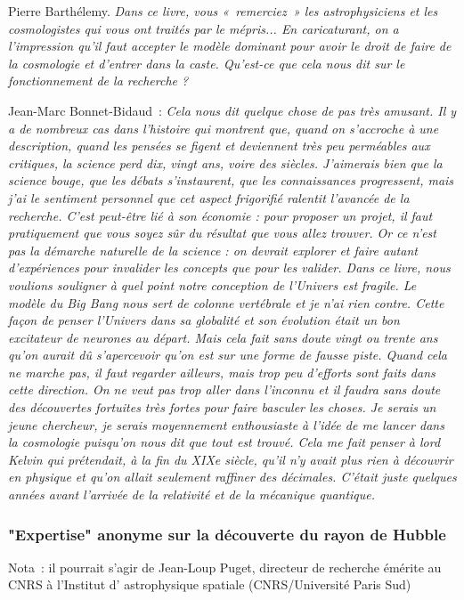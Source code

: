 \documentclass[a4paper,12pt]{article}
\begin{document}
Pierre Barthélemy. \textit{Dans ce livre, vous « remerciez » les astrophysiciens et les cosmologistes qui vous ont traités par le mépris... En caricaturant, on a l'impression qu'il faut accepter le modèle dominant pour avoir le droit de faire de la cosmologie et d'entrer dans la caste. Qu'est-ce que cela nous dit sur le fonctionnement de la recherche ?}

Jean-Marc Bonnet-Bidaud : \textit{Cela nous dit quelque chose de pas très amusant. Il y a de nombreux cas dans l'histoire qui montrent que, quand on s'accroche à une description, quand les pensées se figent et deviennent très peu perméables aux critiques, la science perd dix, vingt ans, voire des siècles. J'aimerais bien que la science bouge, que les débats s'instaurent, que les connaissances progressent, mais j'ai le sentiment personnel que cet aspect frigorifié ralentit l'avancée de la recherche. C'est peut-être lié à son économie : pour proposer un projet, il faut pratiquement que vous soyez sûr du résultat que vous allez trouver. Or ce n'est pas la démarche naturelle de la science : on devrait explorer et faire autant d'expériences pour invalider les concepts que pour les valider. Dans ce livre, nous voulions souligner à quel point notre conception de l'Univers est fragile. Le modèle du Big Bang nous sert de colonne vertébrale et je n’ai rien contre. Cette façon de penser l'Univers dans sa globalité et son évolution était un bon excitateur de neurones au départ. Mais cela fait sans doute vingt ou trente ans qu'on aurait dû s'apercevoir qu'on est sur une forme de fausse piste. Quand cela ne marche pas, il faut regarder ailleurs, mais trop peu d'efforts sont faits dans cette direction. On ne veut pas trop aller dans l'inconnu et il faudra sans doute des découvertes fortuites très fortes pour faire basculer les choses. Je serais un jeune chercheur, je serais moyennement enthousiaste à l'idée de me lancer dans la cosmologie puisqu'on nous dit que tout est trouvé. Cela me fait penser à lord Kelvin qui prétendait, à la fin du XIXe siècle, qu'il n'y avait plus rien à découvrir en physique et qu'on allait seulement raffiner des décimales. C'était juste quelques années avant l'arrivée de la relativité et de la mécanique quantique.}

\subsubsection{"Expertise" anonyme sur la découverte du rayon de Hubble} 

Nota : il pourrait s’agir de Jean-Loup Puget, directeur de recherche émérite au CNRS à l'Institut d' astrophysique spatiale (CNRS/Université Paris Sud)
\end{document}
